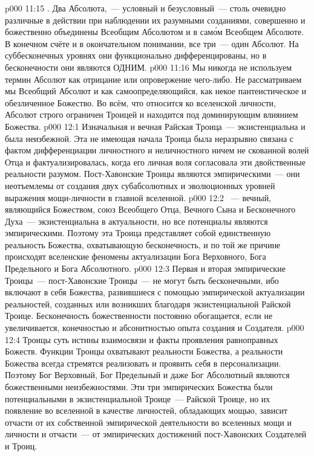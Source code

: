 \vs p000 11:15 \pc {}. Два Абсолюта,~--- условный и безусловный~--- столь очевидно различные в действии при наблюдении их разумными созданиями, совершенно и божественно объединены Всеобщим Абсолютом и в сам\'ом Всеобщем Абсолюте. В конечном счёте и в окончательном понимании, все три~--- один Абсолют. На суббесконечных уровнях они функционально дифференцированы, но в бесконечности они являются ОДНИМ.
\vs p000 11:16 \pc Мы никогда не используем термин Абсолют как отрицание или опровержение чего\hyp{}либо. Не рассматриваем мы Всеобщий Абсолют и как самоопределяющийся, как некое пантеистическое и обезличенное Божество. Во всём, что относится ко вселенской личности, Абсолют строго ограничен Троицей и находится под доминирующим влиянием Божества.
\vs p000 12:1 Изначальная и вечная Райская Троица~--- экзистенциальна и была неизбежной. Эта не имеющая начала Троица была неразрывно связана с фактом дифференциации личностного и неличностного ничем не скованной волей Отца и фактуализировалась, когда его личная воля согласовала эти двойственные реальности разумом. Пост\hyp{}Хавонские Троицы являются эмпирическими~--- они неотъемлемы от создания двух субабсолютных и эволюционных уровней выражения мощи\hyp{}личности в главной вселенной.
\vs p000 12:2 \pc {}~--- вечный, являющийся Божеством, союз Всеобщего Отца, Вечного Сына и Бесконечного Духа~--- экзистенциальна в актуальности, но все потенциалы являются эмпирическими. Поэтому эта Троица представляет собой единственную реальность Божества, охватывающую бесконечность, и по той же причине происходят вселенские феномены актуализации Бога Верховного, Бога Предельного и Бога Абсолютного.
\vs p000 12:3 \pc Первая и вторая эмпирические Троицы~--- пост\hyp{}Хавонские Троицы~--- не могут быть бесконечными, ибо включают в себя  Божества, развившиеся с помощью эмпирической актуализации реальностей, созданных или возникших благодаря экзистенциальной Райской Троице. Бесконечность божественности постоянно обогащается, если не увеличивается, конечностью и абсонитностью опыта создания и Создателя.
\vs p000 12:4 Троицы суть истины взаимосвязи и факты проявления равноправных Божеств. Функции Троицы охватывают реальности Божества, а реальности Божества всегда стремятся реализовать и проявить себя в персонализации. Поэтому Бог Верховный, Бог Предельный и даже Бог Абсолютный являются божественными неизбежностями. Эти три эмпирических Божества были потенциальными в экзистенциальной Троице~--- Райской Троице, но их появление во вселенной в качестве личностей, обладающих мощью, зависит отчасти от их собственной эмпирической деятельности во вселенных мощи и личности и отчасти~--- от эмпирических достижений пост\hyp{}Хавонских Создателей и Троиц.
